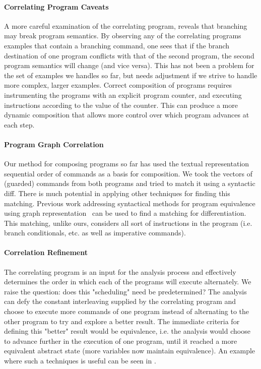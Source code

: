 \paragraph{Correlating Program Caveats}
A more careful examination of the correlating program, reveals that branching may break program semantics. By observing any of the correlating programs examples that contain a branching  command, one sees that if the branch destination of one program conflicts with that of the second program, the second program semantics will change (and vice versa). This has not been a problem for the set of examples we handles so far, but needs adjustment if we strive to handle more complex, larger examples. Correct composition of programs requires instrumenting the programs with an explicit program counter, and executing instructions according to the value of the counter. This can produce a more dynamic composition that allows more control over which program advances at each step. 

\paragraph{Program Graph Correlation}
Our method for composing programs so far has used the textual representation sequential order of commands as a basis for composition. We took the vectors of (guarded) commands from both programs and tried to match it using a syntactic diff. There is much potential in applying other techniques for finding this matching. Previous work addressing syntactical methods for program equivalence using graph representation~\cite{Horwitz89,Horwitz90} can be used to find a matching for differentiation. This matching, unlike ours, considers all sort of instructions in the program (i.e. branch conditionals, etc. as well as imperative commands).

\paragraph{Correlation Refinement} The correlating program is an input for the analysis process and effectively determines the order in which each of the programs will execute alternately. We raise the question: does this "scheduling" need be predetermined? The analysis can defy the constant interleaving supplied by the correlating program and choose to execute more commands of one program instead of alternating to the other program to try and explore a better result. The immediate criteria for defining this "better" result would be equivalence, i.e. the analysis would choose to advance further in the execution of one program, until it reached a more equivalent abstract state (more variables now maintain equivalence). An example where such a techniques is useful can be seen in . 

